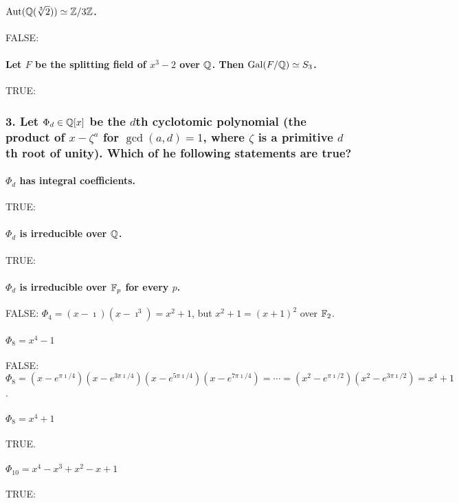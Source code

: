 \paragraph*{$\mathrm{Aut}(\mathbb{Q}(\sqrt[3]{2})) \simeq \mathbb{Z} / 3\mathbb{Z}$.}
FALSE: %

\paragraph*{Let $F$ be the splitting field of $x^3 - 2$ over $\mathbb{Q}$. Then $\mathrm{Gal}(F / \mathbb{Q}) \simeq S_3$.}
TRUE: %

\subsubsection*{3. Let $\Phi_d \in \mathbb{Q}[x]$ be the $d$th cyclotomic polynomial (the product of $x - \zeta^a$ for $\gcd(a, d) = 1$, where $\zeta$ is a primitive $d$th root of unity). Which of he following statements are true?}
\paragraph*{$\Phi_d$ has integral coefficients.}
TRUE: %

\paragraph*{$\Phi_d$ is irreducible over $\mathbb{Q}$.}
TRUE: %

\paragraph*{$\Phi_d$ is irreducible over $\mathbb{F}_p$ for every $p$.}
FALSE: $\Phi_4 = (x - \imath)(x - \imath^3) = x^2 + 1$, but $x^2 + 1 = (x + 1)^2$ over $\mathbb{F}_2$.

\paragraph*{$\Phi_8 = x^4 - 1$}
FALSE: $\Phi_8 = (x - e^{\pi\imath/4})(x - e^{3\pi\imath/4})(x - e^{5\pi\imath/4})(x - e^{7\pi\imath/4}) = \dotsb = (x^2 - e^{\pi\imath/2})(x^2 - e^{3\pi\imath/2}) = x^4 + 1$.

\paragraph*{$\Phi_8 = x^4 + 1$}
TRUE.

\paragraph*{$\Phi_{10} = x^4 - x^3 + x^2 - x + 1$}
TRUE: %

